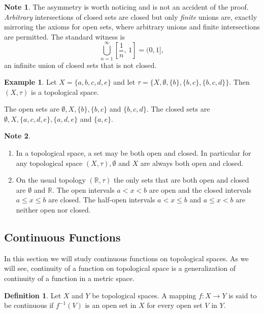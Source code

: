 \documentclass[11pt,a4paper]{article}
\theoremstyle{definition}
\newtheorem{defn}[thm]{Definition}
\newtheorem{exa}[thm]{Example}
\newtheorem*{note}{Note}
\begin{document}
\begin{note}
The asymmetry is worth noticing and is not an accident of the proof.
\emph{Arbitrary} intersections of closed sets are closed but only \emph{finite}
unions are, exactly mirroring the axioms for open sets, where arbitrary unions
and finite intersections are permitted. The standard witness is
$$\bigcup_{n=1}^{\infty}\left[\frac1n,\,1\right] = (0,1],$$
an infinite union of closed sets that is not closed.
\end{note}




\begin{exa}
Let $X=\{a,b,c,d,e\}$ and let $\tau =\{X,\emptyset,\{b\},\{b,c\},\{b,c,d\}\}$. Then $(X,\tau)$ is a topological space.

The open sets are $\emptyset, X,\{b\},\{b,c\}$ and $\{b,c,d\}$. The closed sets are $\emptyset,X,\{a,c,d,e\},\{a,d,e\}$ and $\{a,e\}$.
\end{exa}

\begin{note}
\begin{enumerate}
\item[i] In a topological space, a set may be both open and closed. In particular for any topological space $(X,\tau),\emptyset$ and $X$ are always both open and closed.
\item[ii] On the usual topology $(\mathbb{R},\tau)$ the only sets that are both open and closed are $\emptyset$ and $\mathbb{R}$. The open intervals $a<x<b$ are open and the closed intervals $a\leq x\leq b$ are closed. The half-open intervals $a<x\leq b$ and $a\leq x<b$ are neither open nor closed.
\end{enumerate}
\end{note}











\subsection{Continuous Functions}
In this section we will study continuous functions on topological spaces. As we will see, continuity of a function on topological space is a generalization of continuity of a function in a metric space.


\begin{defn}
Let $X$ and $Y$ be topological spaces. A mapping $f:X\rightarrow Y$ is said to be continuous if $f^{-1}(V)$ is an open set in $X$ for every open set $V$ in $Y$.
\end{defn}
\end{document}
